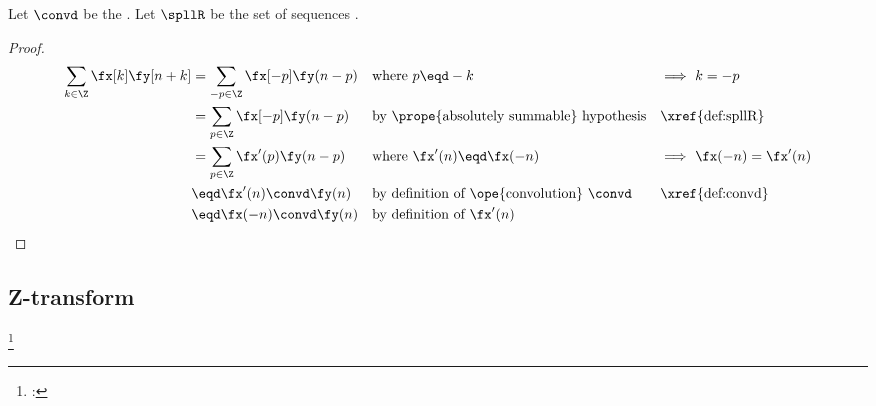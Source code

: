 \begin{proposition}
\label{prop:conv_knk}
Let $\convd$ be the  .
Let $\spllR$ be the set of  sequences .
\end{proposition}
\begin{proof}
\begin{align*}
  \sum_{k\in\Z} \fx[k]\fy[n+k] 
    &= \sum_{-p\in\Z} \fx[-p]\fy(n-p) 
    && \text{where $p\eqd -k$}
    && \text{$\implies$ $k=-p$}
  \\&= \sum_{p\in\Z} \fx[-p]\fy(n-p) 
    && \text{by \prope{absolutely summable} hypothesis}
    && \text{\xref{def:spllR}}
  \\&= \sum_{p\in\Z} \fx'(p)\fy(n-p) 
    && \text{where $\fx'(n) \eqd\fx(-n)$}
    && \text{$\implies$ $\fx(-n)=\fx'(n)$}
  \\&\eqd \fx'(n)\convd\fy(n)
    && \text{by definition of \ope{convolution} $\convd$}
    && \text{\xref{def:convd}}
  \\&\eqd \fx(-n)\convd\fy(n)
    && \text{by definition of $\fx'(n)$}
\end{align*}
\end{proof}

\subsection{Z-transform}
\begin{definition}
\footnote{
  : 
  }
\label{def:opZ}
\end{definition}


